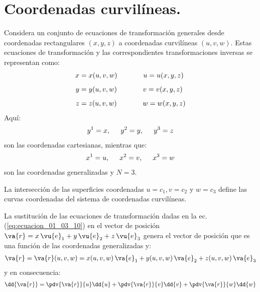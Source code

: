 \section{Coordenadas curvilíneas.}

Considera un conjunto de ecuaciones de transformación generales desde coordenadas rectangulares $(x, y, z)$ a coordenadas curvilíneas $(u, v, w)$. Estas ecuaciones de transformación y las correspondientes transformaciones inversas se representan como:
\begin{align}
\begin{aligned}
x &= x(u, v, w) \hspace{1.3cm} u = u(x, y, z) \\[0.5em]
y &= y(u, v, w) \hspace{1.3cm} v = v(x, y, z) \\[0.5em]
z &= z(u, v, w) \hspace{1.3cm} w = w(x, y, z)
\end{aligned}
\label{eq:ecuacion_01_03_10}
\end{align}
Aquí: 
\begin{align*}
y^{1} = x, \hspace{0.5cm} y^{2} = y, \hspace{0.5cm} y^{3} = z
\end{align*}
son las coordenadas cartesianas, mientras que:
\begin{align*}
x^{1} = u, \hspace{0.5cm} x^{2} = v, \hspace{0.5cm} x^{3} = w
\end{align*}
son las coordenadas generalizadas y $N = 3$.
\par
La intersección de las superficies coordenadas $u = c_{1}, v = c_{2}$ y $w = c_{3}$ define las curvas coordenadas del sistema de coordenadas curvilíneas.
\par
La sustitución de las ecuaciones de transformación dadas en la ec. (\ref{eq:ecuacion_01_03_10}) en el vector de posición $\va{r} = x\, \vu{e}_{1} + y\, \vu{e}_{2} + z\, \vu{e}_{3}$ genera el vector de posición que es una función de las coordenadas generalizadas y:
\begin{align*}
\va{r} = \va{r} (u, v, w) = x (u, v, w) \, \va{e}_{1} + y (u, v, w) \, \va{e}_{2} + z (u, v, w) \, \va{e}_{3}
\end{align*}
y en consecuencia:
\begin{align*}
\dd{\va{r}} = \pdv{\va{r}}{u} \dd{u} + \pdv{\va{r}}{v} \dd{v} + \pdv{\va{r}}{w} \dd{w}
\end{align*}

